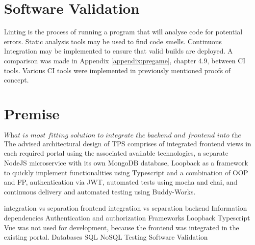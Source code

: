 %
\section{Software Validation}
Linting is the process of running a program that will analyse code for potential errors. Static analysis tools may be used to find code smells. Continuous Integration may be implemented to ensure that valid builds are deployed. A comparison was made in Appendix \ref{appendix:pregame}, chapter 4.9, between CI tools. Various CI tools were implemented in previously mentioned proofs of concept.

%
\section{Premise}
\[\textit{What is most fitting solution to integrate the backend and frontend into the existing architecture?}\]
The advised architectural design of TPS comprises of integrated frontend views in each required portal using the associated available technologies, a separate NodeJS microservice with its own MongoDB database, Loopback as a framework to quickly implement functionalities using Typescript and a combination of OOP and FP, authentication via JWT, automated tests using mocha and chai, and continuous delivery and automated testing using Buddy-Works.

integration vs separation frontend
integration vs separation backend
Information dependencies
Authentication and authorization
Frameworks
	Loopback Typescript
	Vue was not used for development, because the frontend was integrated in the existing portal.
Databases
	SQL
	NoSQL
Testing
Software Validation
